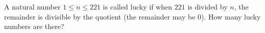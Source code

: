 A natural number $1 \leqslant n\leqslant221$ is called lucky if when $221$ is divided by $n$, the remainder is divisible by the quotient (the remainder may be $0$). How many lucky numbers are there?
